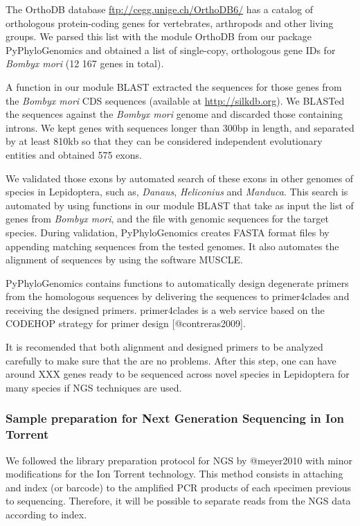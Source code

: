 \documentclass[]{article}
\begin{document}
The OrthoDB database \url{ftp://cegg.unige.ch/OrthoDB6/} has a catalog
of orthologous protein-coding genes for vertebrates, arthropods and
other living groups. We parsed this list with the module OrthoDB from
our package PyPhyloGenomics and obtained a list of single-copy,
orthologous gene IDs for \emph{Bombyx mori} (12 167 genes in total).

A function in our module BLAST extracted the sequences for those genes
from the \emph{Bombyx mori} CDS sequences (available at
\url{http://silkdb.org}). We BLASTed the sequences against the
\emph{Bombyx mori} genome and discarded those containing introns. We
kept genes with sequences longer than 300bp in length, and separated by
at least 810kb so that they can be considered independent evolutionary
entities and obtained 575 exons.

We validated those exons by automated search of these exons in other
genomes of species in Lepidoptera, such as, \emph{Danaus},
\emph{Heliconius} and \emph{Manduca}. This search is automated by using
functions in our module BLAST that take as input the list of genes from
\emph{Bombyx mori}, and the file with genomic sequences for the target
species. During validation, PyPhyloGenomics creates FASTA format files
by appending matching sequences from the tested genomes. It also
automates the alignment of sequences by using the software MUSCLE.

PyPhyloGenomics contains functions to automatically design degenerate
primers from the homologous sequences by delivering the sequences to
primer4clades and receiving the designed primers. primer4clades is a web
service based on the CODEHOP strategy for primer design
{[}@contreras2009{]}.

It is recomended that both alignment and designed primers to be analyzed
carefully to make sure that the are no problems. After this step, one
can have around XXX genes ready to be sequenced across novel species in
Lepidoptera for many species if NGS techniques are used.

\subsubsection{Sample preparation for Next Generation Sequencing in Ion
Torrent}

We followed the library preparation protocol for NGS by @meyer2010 with
minor modifications for the Ion Torrent technology. This method consists
in attaching and index (or barcode) to the amplified PCR products of
each specimen previous to sequencing. Therefore, it will be possible to
separate reads from the NGS data according to index.
\end{document}
